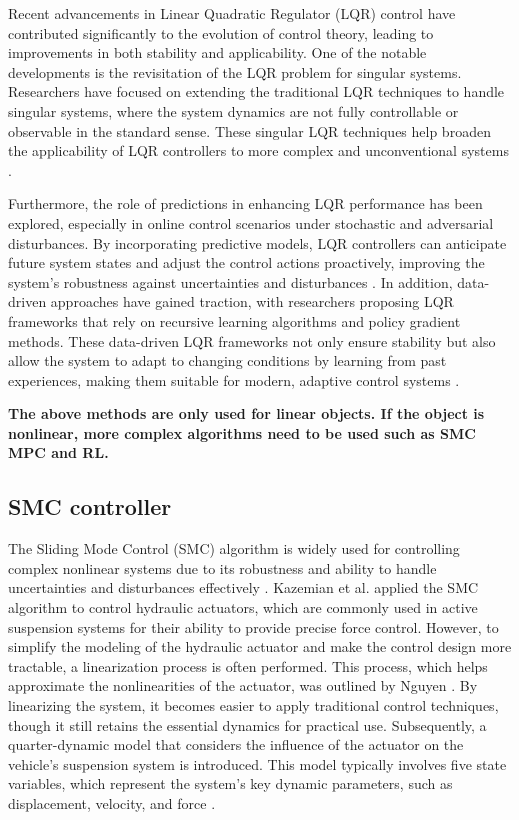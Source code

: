 Recent advancements in Linear Quadratic Regulator (LQR) control have contributed significantly to the evolution of control theory, leading to improvements in both stability and applicability. One of the notable developments is the revisitation of the LQR problem for singular systems. Researchers have focused on extending the traditional LQR techniques to handle singular systems, where the system dynamics are not fully controllable or observable in the standard sense. These singular LQR techniques help broaden the applicability of LQR controllers to more complex and unconventional systems \cite{lqr_singular_systems}.

Furthermore, the role of predictions in enhancing LQR performance has been explored, especially in online control scenarios under stochastic and adversarial disturbances. By incorporating predictive models, LQR controllers can anticipate future system states and adjust the control actions proactively, improving the system's robustness against uncertainties and disturbances \cite{lqr_predictions}. In addition, data-driven approaches have gained traction, with researchers proposing LQR frameworks that rely on recursive learning algorithms and policy gradient methods. These data-driven LQR frameworks not only ensure stability but also allow the system to adapt to changing conditions by learning from past experiences, making them suitable for modern, adaptive control systems \cite{lqr_stability_recursive}.
	
\textbf{The above methods are only used for linear objects. If the object is nonlinear, more complex algorithms need to be used such as SMC MPC and RL.}




\subsection{SMC controller}
The Sliding Mode Control (SMC) algorithm is widely used for controlling complex nonlinear systems due to its robustness and ability to handle uncertainties and disturbances effectively \cite{meetei2021enhanced}. Kazemian et al. applied the SMC algorithm to control hydraulic actuators, which are commonly used in active suspension systems for their ability to provide precise force control. However, to simplify the modeling of the hydraulic actuator and make the control design more tractable, a linearization process is often performed. This process, which helps approximate the nonlinearities of the actuator, was outlined by Nguyen \cite{nguyen2021advance}. By linearizing the system, it becomes easier to apply traditional control techniques, though it still retains the essential dynamics for practical use. Subsequently, a quarter-dynamic model that considers the influence of the actuator on the vehicle's suspension system is introduced. This model typically involves five state variables, which represent the system's key dynamic parameters, such as displacement, velocity, and force \cite{nguyen2022novel}.

